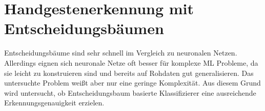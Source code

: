 \chapter{Handgestenerkennung mit Entscheidungsbäumen}
Entscheidungsbäume sind sehr schnell im Vergleich zu neuronalen Netzen. Allerdings eignen sich neuronale Netze oft besser für komplexe ML Probleme, da sie leicht zu konstruieren sind
und bereits auf Rohdaten gut generalisieren. Das untersuchte Problem weißt aber nur eine geringe Komplexität. Aus diesem Grund wird untersucht, ob Entscheidungsbaum basierte Klassifizierer
eine ausreichende Erkennungsgenauigkeit erzielen.




